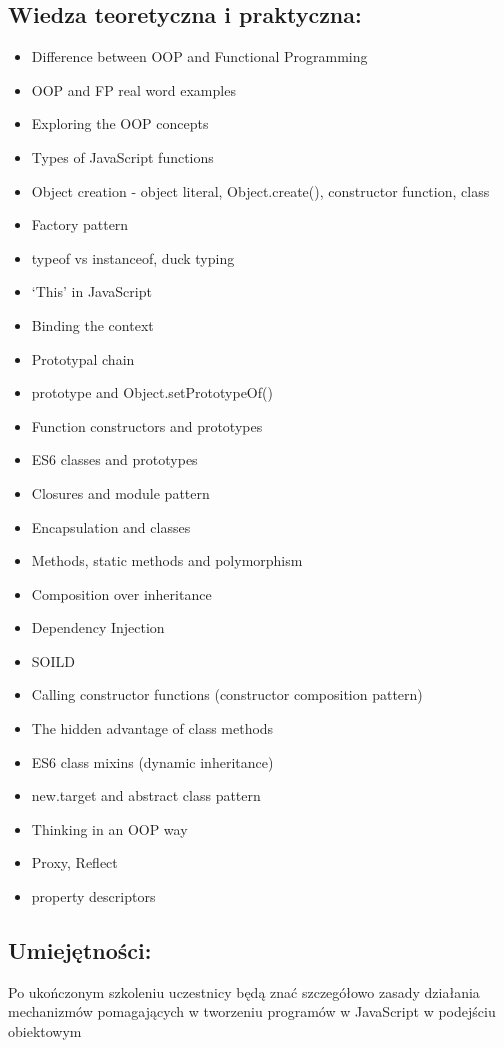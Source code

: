 \documentclass{article}[10pt]
\begin{document}
	\subsection*{Wiedza teoretyczna i praktyczna:}
\begin{adjustwidth}{1.5cm}{}
	\begin{itemize}
		\item Difference between OOP and Functional Programming
		\item OOP and FP real word examples
		\item Exploring the OOP concepts
		\item Types of JavaScript functions
		\item Object creation - object literal, Object.create(), constructor function, class
		\item Factory pattern
		\item typeof vs instanceof, duck typing
		\item ‘This’ in JavaScript
		\item Binding the context
		\item Prototypal chain
		\item prototype and Object.setPrototypeOf()
		\item Function constructors and prototypes
		\item ES6 classes and prototypes
		\item Closures and module pattern
		\item Encapsulation and classes
		\item Methods, static methods and polymorphism
		\item Composition over inheritance
		\item Dependency Injection
		\item SOILD
		\item Calling constructor functions (constructor composition pattern)
		\item The hidden advantage of class methods
		\item ES6 class mixins (dynamic inheritance)
		\item new.target and abstract class pattern
		\item Thinking in an OOP way
		\item Proxy, Reflect
		\item property descriptors
	\end{itemize}
\end{adjustwidth}

	\subsection*{Umiejętności:}
\begin{adjustwidth}{2cm}{}
\justifying
	
Po ukończonym szkoleniu uczestnicy będą znać szczegółowo zasady działania mechanizmów pomagających w tworzeniu programów w JavaScript w podejściu obiektowym
\end{adjustwidth}
\end{document}
